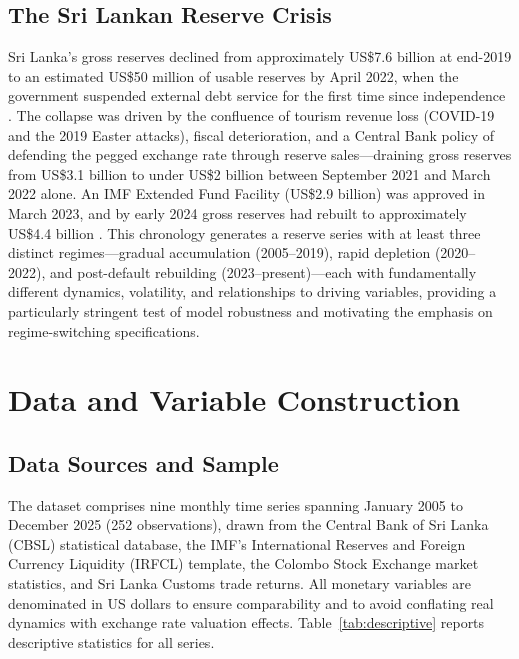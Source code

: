 \documentclass[12pt,a4paper]{article}
\begin{document}
\subsection{The Sri Lankan Reserve Crisis}

Sri Lanka's gross reserves declined from approximately US\$7.6 billion at end-2019 to an estimated US\$50 million of usable reserves by April 2022, when the government suspended external debt service for the first time since independence \citep{Athukorala2024,Wignaraja2024}. The collapse was driven by the confluence of tourism revenue loss (COVID-19 and the 2019 Easter attacks), fiscal deterioration, and a Central Bank policy of defending the pegged exchange rate through reserve sales---draining gross reserves from US\$3.1 billion to under US\$2 billion between September 2021 and March 2022 alone. An IMF Extended Fund Facility (US\$2.9 billion) was approved in March 2023, and by early 2024 gross reserves had rebuilt to approximately US\$4.4 billion \citep{Weerakoon2023,UNDP2022}. This chronology generates a reserve series with at least three distinct regimes---gradual accumulation (2005--2019), rapid depletion (2020--2022), and post-default rebuilding (2023--present)---each with fundamentally different dynamics, volatility, and relationships to driving variables, providing a particularly stringent test of model robustness and motivating the emphasis on regime-switching specifications.

\section{Data and Variable Construction}

\subsection{Data Sources and Sample}

The dataset comprises nine monthly time series spanning January 2005 to December 2025 (252 observations), drawn from the Central Bank of Sri Lanka (CBSL) statistical database, the IMF's International Reserves and Foreign Currency Liquidity (IRFCL) template, the Colombo Stock Exchange market statistics, and Sri Lanka Customs trade returns. All monetary variables are denominated in US dollars to ensure comparability and to avoid conflating real dynamics with exchange rate valuation effects. Table~\ref{tab:descriptive} reports descriptive statistics for all series.
\end{document}

